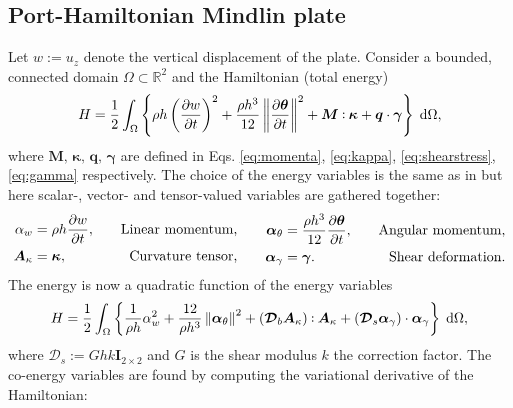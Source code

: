 \subsection{Port-Hamiltonian Mindlin plate}\label{sec:pHmin}
Let $w:= u_z$ denote the vertical displacement of the plate. Consider a bounded, connected domain $\Omega \subset \mathbb{R}^2$ and the Hamiltonian (total energy)
	\begin{equation}
	\label{eq:H_min}
	H = \frac{1}{2} \int_{\Omega}  \left\{ \rho h \left(\diffp{w}{t} \right)^2 + \frac{\rho h^3}{12} \norm{\diffp{\bm{\theta}}{t}}^2 +   \bm{M} \cddot \bm{\kappa} + \bm{q} \cdot \bm{\gamma}  \right\}  \d\Omega, 
	\end{equation}
	where $\bm{M},\, \bm{\kappa},\, \bm{q}, \, \bm{\gamma}$ are defined in Eqs. \eqref{eq:momenta}, \eqref{eq:kappa}, \eqref{eq:shearstress}, \eqref{eq:gamma} respectively. 
	The choice of the energy variables is the same as in \cite{macchelli2005mindlin} but here scalar-,  vector- and tensor-valued variables are gathered together:
\begin{equation}\label{eq:alpha_Min}
\begin{aligned}
\alpha_w &= \rho h \diffp{w}{t}, \quad &\text{Linear momentum,} \\
\bm{A}_{\kappa} &= \bm{\kappa}, \quad &\text{Curvature tensor,} \\
\end{aligned} \qquad
\begin{aligned}
\bm\alpha_{\theta} &=  \frac{\rho h^3}{12} \diffp{\bm{\theta}}{t}, \quad &\text{Angular momentum,}\\
\bm\alpha_{\gamma} &= \bm{\gamma}. \quad &\text{Shear deformation.}\\
\end{aligned}
\end{equation}
The energy is now a quadratic function of the energy variables
\begin{equation}
\label{eq:Halpha_min}
H = \frac{1}{2} \int_{\Omega}  \left\{ \frac{1}{\rho h}\alpha_w^2 + \frac{12}{\rho h^3} \norm{\bm{\alpha}_{\theta}}^2 + (\bm{\mathcal{D}}_b \bm{A}_\kappa) \cddot \bm{A}_\kappa + (\bm{\mathcal{D}}_s \bm{\alpha}_\gamma) \cdot  \bm{\alpha}_\gamma  \right\}  \d\Omega, 
\end{equation}
where $\bm{\mathcal{D}}_s:= Ghk \bm{I}_{2\times 2}$ and $G$ is the shear modulus $k$ the correction factor. The co-energy variables are found by computing the variational derivative of the Hamiltonian:
